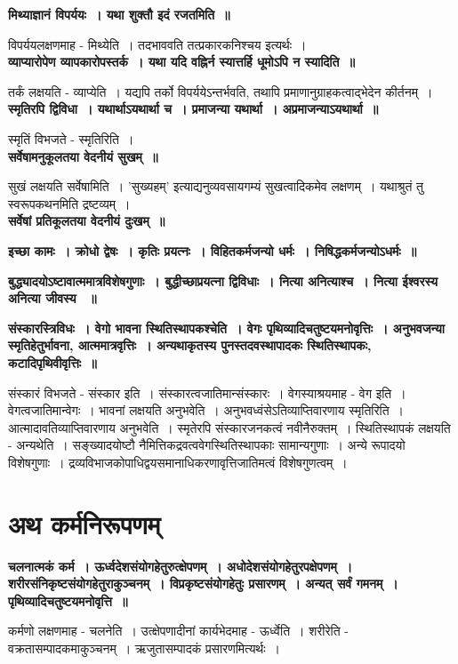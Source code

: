 	{\bfseries मिथ्याज्ञानं विपर्ययः~। यथा शुक्तौ इदं रजतमिति~॥}\par
		विपर्ययलक्षणमाह - मिथ्येति~। तदभाववति तत्प्रकारकनिश्चय इत्यर्थः~।\\[10pt]
	{\bfseries व्याप्यारोपेण व्यापकारोपस्तर्क~। यथा यदि वह्निर्न स्यात्तर्हि धूमोऽपि न स्यादिति~॥}\par
		तर्कं लक्षयति - व्याप्येति~। यद्यपि तर्को विपर्ययेऽन्तर्भवति, तथापि प्रमाणानुग्राहकत्वाद्भेदेन कीर्तनम्~।\\[10pt]
	{\bfseries स्मृतिरपि द्विविधा~। यथार्थाऽयथार्था च~। प्रमाजन्या यथार्था~। अप्रमाजन्याऽयथार्था~॥}\par
		स्मृतिं विभजते - स्मृतिरिति~।\\[10pt]
	{\bfseries सर्वेषामनुकूलतया वेदनीयं सुखम्~॥}\par
		सुखं लक्षयति सर्वेषामिति~। ’सुख्यहम्’ इत्याद्यनुव्यवसायगम्यं सुखत्वादिकमेव लक्षणम्~। यथाश्रुतं तु स्वरूपकथनमिति द्रष्टव्यम्~।\\[10pt]
	{\bfseries सर्वेषां प्रतिकूलतया वेदनीयं दुःखम्~॥}\par
	{\bfseries इच्छा कामः~। क्रोधो द्वेषः~। कृतिः प्रयत्नः~। विहितकर्मजन्यो धर्मः~। निषिद्धकर्मजन्योऽधर्मः~॥}\par
	{\bfseries बुद्ध्यादयोऽष्टावात्ममात्रविशेषगुणाः~। बुद्धीच्छाप्रयत्ना द्विविधाः~। नित्या अनित्याश्च~। नित्या ईश्वरस्य अनित्या जीवस्य ~॥}\par
	{\bfseries संस्कारस्त्रिविधः~। वेगो भावना स्थितिस्थापकश्चेति~। वेगः पृथिव्यादिचतुष्टयमनोवृत्तिः~। अनुभवजन्या स्मृतिहेतुर्भावना, आत्ममात्रवृत्तिः~। अन्यथाकृतस्य पुनस्तदवस्थापादकः स्थितिस्थापकः, कटादिपृथिवीवृत्तिः~॥}\par
		संस्कारं विभजते - संस्कार इति~। संस्कारत्वजातिमान्संस्कारः~। वेगस्याश्रयमाह - वेग इति~। वेगत्वजातिमान्वेगः~। भावनां लक्षयति अनुभवेति~। अनुभवध्वंसेऽतिव्याप्तिवारणाय स्मृतिरिति~। आत्मादावतिव्याप्तिवारणाय अनुभवेति~। स्मृतेरपि संस्कारजनकत्वं नवीनैरुक्तम्~। स्थितिस्थापकं लक्षयति - अन्यथेति~। सङ्ख्यादयोष्टौ नैमित्तिकद्रवत्ववेगस्थितिस्थापकाः सामान्यगुणाः~। अन्ये रूपादयो विशेषगुणाः~। द्रव्यविभाजकोपाधिद्वयसमानाधिकरणावृत्तिजातिमत्वं विशेषगुणत्वम्~।\\
\section*{अथ कर्मनिरूपणम्}
	{\bfseries चलनात्मकं कर्म~। ऊर्ध्वदेशसंयोगहेतुरुत्क्षेपणम्~। अधोदेशसंयोगहेतुरपक्षेपणम्~। शरीरसंनिकृष्टसंयोगहेतुराकुञ्चनम्~। विप्रकृष्टसंयोगहेतुः प्रसारणम्~। अन्यत् सर्वं गमनम्~। पृथिव्यादिचतुष्टयमनोवृत्ति~॥}\par
		कर्मणो लक्षणमाह - चलनेति~। उत्क्षेपणादीनां कार्यभेदमाह - ऊर्ध्वेति~। शरीरेति - वक्रतासम्पादकमाकुञ्चनम्~। ऋजुतासम्पादकं प्रसारणमित्यर्थः~।\\
